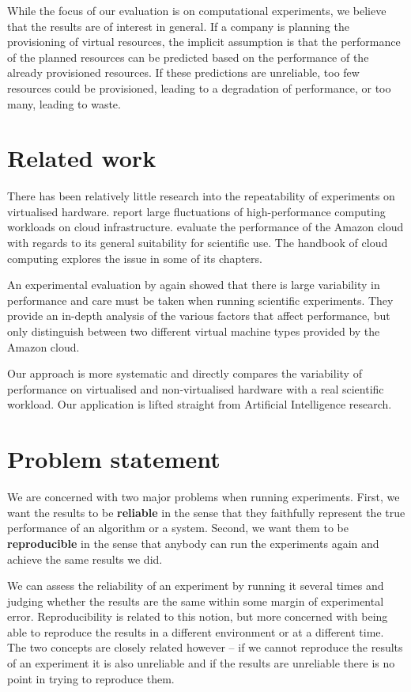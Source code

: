 \documentclass{llncs}
\begin{document}
While the focus of our evaluation is on computational experiments, we believe
that the results are of interest in general. If a company is planning the
provisioning of virtual resources, the implicit assumption is that the
performance of the planned resources can be predicted based on the performance
of the already provisioned resources. If these predictions are unreliable, too
few resources could be provisioned, leading to a degradation of performance,
or too many, leading to waste.


\section{Related work}

There has been relatively little research into the repeatability of experiments
on virtualised hardware. \cite{exploring} report large fluctuations of
high-performance computing workloads on cloud infrastructure. \cite{cloudperf}
evaluate the performance of the Amazon cloud with regards to its general
suitability for scientific use.  The handbook of cloud
computing \citep{cloudhand} explores the issue in some of its chapters.


An experimental evaluation by \cite{cloudruntime} again showed that there is
large variability in performance and care must be taken when running scientific
experiments. They provide an in-depth analysis of the various factors that
affect performance, but only distinguish between two different virtual machine
types provided by the Amazon cloud.

Our approach is more systematic and directly compares the variability of
performance on virtualised and non-virtualised hardware with a real scientific
workload. Our application is lifted straight from Artificial Intelligence
research.


\section{Problem statement}

We are concerned with two major problems when running experiments. First, we
want the results to be \textbf{reliable} in the sense that they faithfully
represent the true performance of an algorithm or a system. Second, we want them
to be \textbf{reproducible} in the sense that anybody can run the experiments
again and achieve the same results we did.

We can assess the reliability of an experiment by running it several times and
judging whether the results are the same within some margin of experimental
error.  Reproducibility is related to this notion, but more concerned with being
able to reproduce the results in a different environment or at a different time.
The two concepts are closely related however -- if we cannot reproduce the
results of an experiment it is also unreliable and if the results are unreliable
there is no point in trying to reproduce them.
\end{document}
